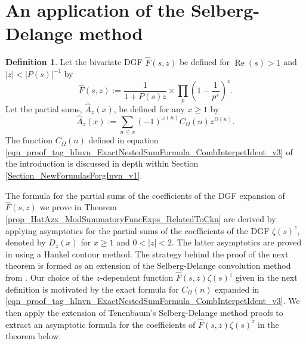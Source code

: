 \documentclass[11pt,reqno,a4letter]{article}
\newcommand{\hlocalref}[1]{\hyperref[#1]{\ref{#1}}}
\numberwithin{equation}{section}
\numberwithin{figure}{section}
\numberwithin{table}{section}
\theoremstyle{plain}
\numberwithin{theorem}{section}
\theoremstyle{definition}
\newtheorem{definition}[theorem]{Definition}
\renewcommand{\Re}{\operatorname{Re}}
\begin{document}
\section{An application of the Selberg-Delange method}

\begin{definition}
Let the bivariate DGF $\widehat{F}(s, z)$ be defined 
for $\Re(s) > 1$ and $|z| < |P(s)|^{-1}$ by 
\[
\widehat{F}(s, z) := \frac{1}{1+P(s) z} 
     \times \prod_p \left(1 - \frac{1}{p^s}\right)^{z}. 
\]
Let the partial sums, $\widehat{A}_z(x)$, be defined for any $x \geq 1$ by 
\[
\widehat{A}_z(x) := \sum_{n \leq x} (-1)^{\omega(n)} 
     C_{\Omega}(n) z^{\Omega(n)}. 
\]
The function $C_{\Omega}(n)$ defined in equation 
\eqref{eqn_proof_tag_hInvn_ExactNestedSumFormula_CombInterpetIdent_v3} 
of the introduction is discussed in depth within 
Section \hlocalref{Section_NewFormulasForgInvn_v1}. 
\end{definition}

The formula for the partial sums of the coefficients of the DGF expansion of $\widehat{F}(s, z)$ 
we prove in Theorem \hlocalref{prop_HatAzx_ModSummatoryFuncExps_RelatedToCkn} are 
derived by applying asymptotics for the partial sums of the coefficients of the DGF 
$\zeta(s)^z$, denoted by $D_z(x)$ for $x \geq 1$ and $0 < |z| < 2$. 
The latter asymptotics are proved in \cite[\S 7.4]{MV} using a 
Hankel contour method. 
The strategy behind the proof of the next theorem is formed as an extension of the 
Selberg-Delange convolution method from \cite[\S II.6.1]{TENENBAUM-PROBNUMT-METHODS}. 
Our choice of the $z$-dependent function $\widehat{F}(s, z) \zeta(s)^{z}$ given in the next definition 
is motivated by the exact formula for $C_{\Omega}(n)$ expanded in 
\eqref{eqn_proof_tag_hInvn_ExactNestedSumFormula_CombInterpetIdent_v3}. 
We then apply the extension of Tenenbaum's Selberg-Delange method proofs to extract 
an asymptotic formula for the coefficients of $\widehat{F}(s, z) \zeta(s)^{z}$ in the theorem below. 
\end{document}

